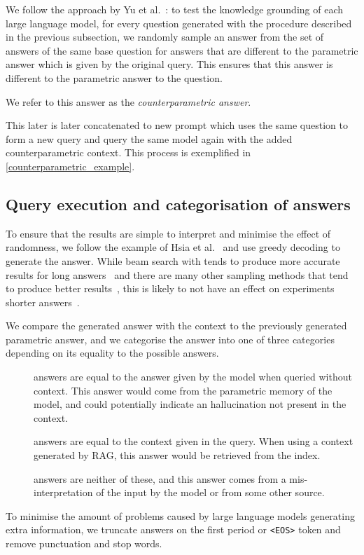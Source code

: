 We follow the approach by Yu et al.~\cite{factual_recall}: to test the knowledge grounding of each large language model, for every question generated with the procedure described in the previous subsection, we randomly sample an answer from the set of answers of the same base question for answers that are different to the parametric answer which is given by the original query.
This ensures that this answer is different to the parametric answer to the question.

We refer to this answer as the \emph{counterparametric answer}.

This later is later concatenated to new prompt which uses the same question to form a new query and query the same model again with the added counterparametric context.
This process is exemplified in \cref{counterparametric_example}.

\subsection{Query execution and categorisation of answers}

To ensure that the results are simple to interpret and minimise the effect of randomness, we follow the example of Hsia et al.~\cite{ragged} and use greedy decoding to generate the answer.
While beam search with tends to produce more accurate results for long answers~\cite{sutskever_seq2seqlearning,wu_mltranslation} and there are many other sampling methods that tend to produce better results~\cite{text_degeneration}, this is likely to not have an effect on experiments shorter answers~\cite{t5}.

We compare the generated answer with the context to the previously generated parametric answer, and we categorise the answer into one of three categories depending on its equality to the possible answers.

\begin{description}
	\item[\Parametric{}] answers are equal to the answer given by the model when queried without context.
		This answer would come from the parametric memory of the model, and could potentially indicate an hallucination not present in the context.
	\item[\Contextual{}] answers are equal to the context given in the query.
		When using a context generated by RAG, this answer would be retrieved from the index.
	\item[\Other] answers are neither of these, and this answer comes from a mis-interpretation of the input by the model or from some other source.
\end{description}

To minimise the amount of problems caused by large language models generating extra information, we truncate answers on the first period or \texttt{<EOS>} token and remove punctuation and stop words.

